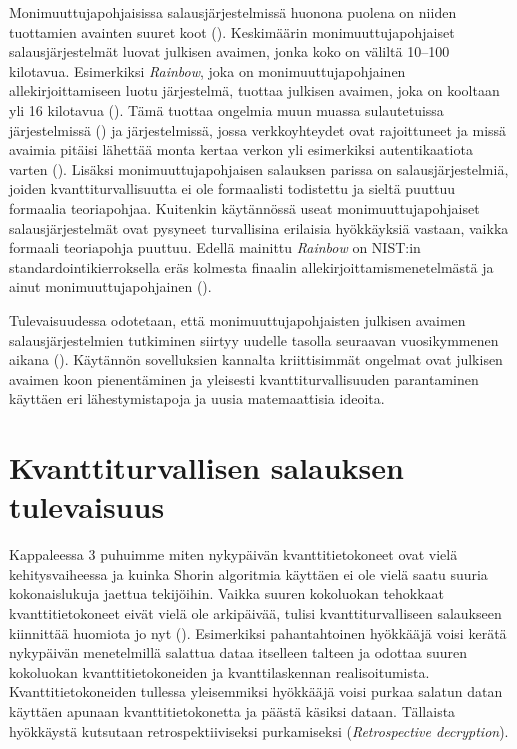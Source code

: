 Monimuuttujapohjaisissa salausjärjestelmissä huonona puolena on niiden tuottamien avainten suuret koot (\cite{8012305}). Keskimäärin monimuuttujapohjaiset salausjärjestelmät luovat julkisen avaimen, jonka koko on väliltä 10--100 kilotavua. Esimerkiksi \emph{Rainbow}, joka on monimuuttujapohjainen allekirjoittamiseen luotu järjestelmä, tuottaa julkisen avaimen, joka on kooltaan yli 16 kilotavua (\cite{Ding2009}). Tämä tuottaa ongelmia muun muassa sulautetuissa järjestelmissä (\cite{8012305}) ja järjestelmissä, jossa verkkoyhteydet ovat rajoittuneet ja missä avaimia pitäisi lähettää monta kertaa verkon yli esimerkiksi autentikaatiota varten (\cite{Ding2009}). Lisäksi monimuuttujapohjaisen salauksen parissa on salausjärjestelmiä, joiden kvanttiturvallisuutta ei ole formaalisti todistettu ja sieltä puuttuu formaalia teoriapohjaa. Kuitenkin käytännössä useat monimuuttujapohjaiset salausjärjestelmät ovat pysyneet turvallisina erilaisia hyökkäyksiä vastaan, vaikka formaali teoriapohja puuttuu. Edellä mainittu \emph{Rainbow} on NIST:in standardointikierroksella eräs kolmesta finaalin allekirjoittamismenetelmästä ja ainut monimuuttujapohjainen (\cite{alagic2020status}).

Tulevaisuudessa odotetaan, että monimuuttujapohjaisten julkisen avaimen salausjärjestelmien tutkiminen siirtyy uudelle tasolla seuraavan vuosikymmenen aikana (\cite{Ding2009}). Käytännön sovelluksien kannalta kriittisimmät ongelmat ovat julkisen avaimen koon pienentäminen ja yleisesti kvanttiturvallisuuden parantaminen käyttäen eri lähestymistapoja ja uusia matemaattisia ideoita.

\section{Kvanttiturvallisen salauksen tulevaisuus}
Kappaleessa 3 puhuimme miten nykypäivän kvanttitietokoneet ovat vielä kehitysvaiheessa ja kuinka Shorin algoritmia käyttäen ei ole vielä saatu suuria kokonaislukuja jaettua tekijöihin. Vaikka suuren kokoluokan tehokkaat kvanttitietokoneet eivät vielä ole arkipäivää, tulisi kvanttiturvalliseen salaukseen kiinnittää huomiota jo nyt (\cite{ad93d053a85c4acebdd49cbe1a75d6bd}). Esimerkiksi pahantahtoinen hyökkääjä voisi kerätä nykypäivän menetelmillä salattua dataa itselleen talteen ja odottaa suuren kokoluokan kvanttitietokoneiden ja kvanttilaskennan realisoitumista. Kvanttitietokoneiden tullessa yleisemmiksi hyökkääjä voisi purkaa salatun datan käyttäen apunaan kvanttitietokonetta ja päästä käsiksi dataan. Tällaista hyökkäystä kutsutaan retrospektiiviseksi purkamiseksi (\emph{Retrospective decryption}).